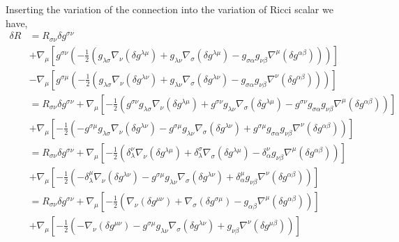 Inserting the variation of the connection into the variation of Ricci scalar we have,
\begin{align*}
\delta R &= R_{\sigma\nu}\delta g^{\sigma\nu} \\
&+ \nabla_{\mu}\left[g^{\sigma\nu}\left(-\frac{1}{2}\left(g_{\lambda\sigma}\nabla_{\nu}\left(\delta g^{\lambda\mu}\right) + g_{\lambda\nu}\nabla_{\sigma}\left(\delta g^{\lambda\mu}\right) - g_{\sigma\alpha}g_{\nu\beta}\nabla^{\mu}\left(\delta g^{\alpha\beta}\right)\right)\right)\right] \\
&- \nabla_{\mu}\left[g^{\sigma\mu}\left(-\frac{1}{2}\left(g_{\lambda\sigma}\nabla_{\nu}\left(\delta g^{\lambda\nu}\right) + g_{\lambda\nu}\nabla_{\sigma}\left(\delta g^{\lambda\nu}\right) - g_{\sigma\alpha}g_{\nu\beta}\nabla^{\nu}\left(\delta g^{\alpha\beta}\right)\right)\right)\right]\\
&=R_{\sigma\nu}\delta g^{\sigma\nu}+ \nabla_{\mu}\left[-\frac{1}{2}\left(g^{\sigma\nu}g_{\lambda\sigma}\nabla_{\nu}\left(\delta g^{\lambda\mu}\right) + g^{\sigma\nu}g_{\lambda\nu}\nabla_{\sigma}\left(\delta g^{\lambda\mu}\right) - g^{\sigma\nu}g_{\sigma\alpha}g_{\nu\beta}\nabla^{\mu}\left(\delta g^{\alpha\beta}\right)\right)\right]\\
&+\nabla_{\mu}\left[-\frac{1}{2}\left(-g^{\sigma\mu}g_{\lambda\sigma}\nabla_{\nu}\left(\delta g^{\lambda\nu}\right) - g^{\sigma\mu}g_{\lambda\nu}\nabla_{\sigma}\left(\delta g^{\lambda\nu}\right) + g^{\sigma\mu}g_{\sigma\alpha}g_{\nu\beta}\nabla^{\nu}\left(\delta g^{\alpha\beta}\right)\right)\right]\\
&=R_{\sigma\nu}\delta g^{\sigma\nu}+ \nabla_{\mu}\left[-\frac{1}{2}\left(\delta^{\nu}_{\lambda}\nabla_{\nu}\left(\delta g^{\lambda\mu}\right) + \delta^{\sigma}_{\lambda}\nabla_{\sigma}\left(\delta g^{\lambda\mu}\right) - \delta^{\nu}_{\alpha}g_{\nu\beta}\nabla^{\mu}\left(\delta g^{\alpha\beta}\right)\right)\right]\\
&+\nabla_{\mu}\left[-\frac{1}{2}\left(-\delta^{\mu}_{\lambda}\nabla_{\nu}\left(\delta g^{\lambda\nu}\right) - g^{\sigma\mu}g_{\lambda\nu}\nabla_{\sigma}\left(\delta g^{\lambda\nu}\right) + \delta^{\mu}_{\alpha}g_{\nu\beta}\nabla^{\nu}\left(\delta g^{\alpha\beta}\right)\right)\right]\\
&=R_{\sigma\nu}\delta g^{\sigma\nu} + \nabla_{\mu}\left[-\frac{1}{2}\left(\nabla_{\nu}\left(\delta g^{\mu\nu}\right) + \nabla_{\sigma}\left(\delta g^{\sigma\mu}\right) - g_{\alpha\beta}\nabla^{\mu}\left(\delta g^{\alpha\beta}\right)\right)\right]\\
&+\nabla_{\mu}\left[-\frac{1}{2}\left(-\nabla_{\nu}\left(\delta g^{\mu\nu}\right) - g^{\sigma\mu}g_{\lambda\nu}\nabla_{\sigma}\left(\delta g^{\lambda\nu}\right) + g_{\nu\beta}\nabla^{\nu}\left(\delta g^{\mu\beta}\right)\right)\right]\\

\end{align*}

